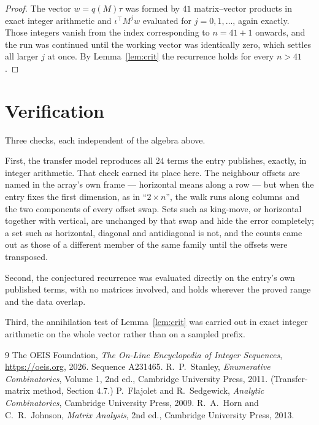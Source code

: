 \documentclass[11pt,a4paper]{article}
\theoremstyle{plain}
\theoremstyle{definition}
\begin{document}
\begin{proof}
The vector $w=q(M)\tau$ was formed by $41$ matrix--vector products in exact integer
arithmetic and $\iota^{\!\top}M^{j}w$ evaluated for $j=0,1,\dots$, again exactly. Those
integers vanish from the index corresponding to $n=41+1$ onwards, and the run was
continued until the working vector was identically zero, which settles all larger $j$ at once.
By Lemma~\ref{lem:crit} the recurrence holds for every $n>41$.
\end{proof}

\section{Verification}

Three checks, each independent of the algebra above.

First, the transfer model reproduces all $24$ terms the entry publishes, exactly, in
integer arithmetic. That check earned its place here. The neighbour offsets are named in the
array's own frame --- horizontal means along a row --- but when the entry fixes the first
dimension, as in ``$2\times n$'', the walk runs along columns and the two components of every
offset swap. Sets such as king-move, or horizontal together with vertical, are unchanged by
that swap and hide the error completely; a set such as horizontal, diagonal and antidiagonal
is not, and the counts came out as those of a different member of the same family until the
offsets were transposed.

Second, the conjectured recurrence was evaluated directly on the entry's own published terms,
with no matrices involved, and holds wherever the proved range and the data overlap.

Third, the annihilation test of Lemma~\ref{lem:crit} was carried out in exact integer
arithmetic on the whole vector rather than on a sampled prefix.

\begin{thebibliography}{9}
 The OEIS Foundation, \emph{The On-Line Encyclopedia of Integer
Sequences}, \url{https://oeis.org}, 2026. Sequence A231465.
 R.~P.~Stanley, \emph{Enumerative Combinatorics}, Volume 1, 2nd ed.,
Cambridge University Press, 2011. (Transfer-matrix method, Section 4.7.)
 P.~Flajolet and R.~Sedgewick, \emph{Analytic Combinatorics}, Cambridge
University Press, 2009.
 R.~A.~Horn and C.~R.~Johnson, \emph{Matrix Analysis}, 2nd ed., Cambridge
University Press, 2013.
\end{thebibliography}
\end{document}
